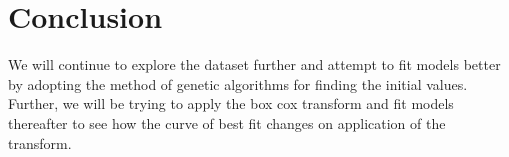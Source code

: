 \documentclass[a4paper]{article}
\begin{document}
\section{Conclusion}
We will continue to explore the dataset further and attempt to fit models better by adopting the method of genetic algorithms for finding the initial values. Further, we will be trying to apply the box cox transform and fit models thereafter to see how the curve of best fit changes on application of the transform.

%
%
\end{document}
